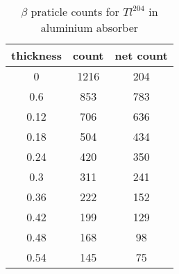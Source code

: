 \begin{table}[H]
    \centering
    \begin{tabular}{|c|c|c|}
        \hline
        thickness & count & net count \\ \hline
        0         & 1216  & 204       \\ \hline
        0.6       & 853   & 783       \\ \hline
        0.12      & 706   & 636       \\ \hline
        0.18      & 504   & 434       \\ \hline
        0.24      & 420   & 350       \\ \hline
        0.3       & 311   & 241       \\ \hline
        0.36      & 222   & 152       \\ \hline
        0.42      & 199   & 129       \\ \hline
        0.48      & 168   & 98        \\ \hline
        0.54      & 145   & 75        \\ \hline
    \end{tabular}
    \label{tab:2}
    \caption{$\beta$ praticle counts for  $Tl^{204}$ in aluminium absorber}
\end{table}